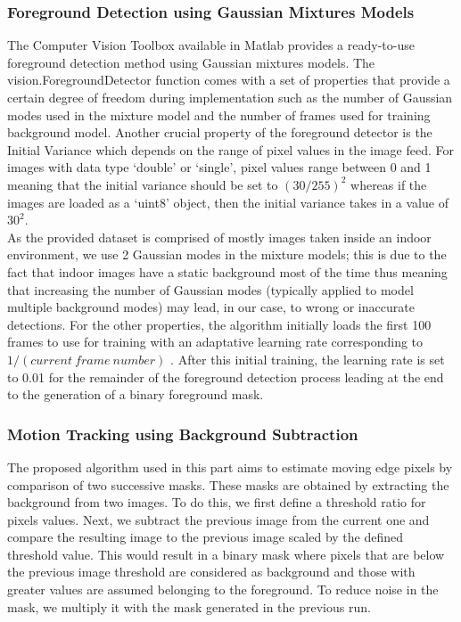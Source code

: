 \subsubsection{Foreground Detection using Gaussian Mixtures Models}
The Computer Vision Toolbox available in Matlab provides a ready-to-use foreground detection method using Gaussian mixtures models. The vision.ForegroundDetector function comes with a set of properties that provide a certain degree of freedom during implementation such as the number of Gaussian modes used in the mixture model and the number of frames used for training background model. Another crucial property of the foreground detector is the Initial Variance which depends on the range of pixel values in the image feed. For images with data type ‘double’ or ‘single’, pixel values range between 0 and 1 meaning that the initial variance should be set to \((30/255)^2\)  whereas if the images are loaded as a ‘uint8’ object, then the initial variance takes in a value of \(30^2\).
\\
As the provided dataset is comprised of mostly images taken inside an indoor environment, we use 2 Gaussian modes in the mixture models; this is due to the fact that indoor images have a static background most of the time thus meaning that increasing the number of Gaussian modes (typically applied to model multiple background modes) may lead, in our case, to wrong or inaccurate detections. For the other properties, the algorithm initially loads the first 100 frames to use for training with an adaptative learning rate corresponding to \(1/\left(current\ frame\ number\right)\) . After this initial training, the learning rate is set to 0.01 for the remainder of the foreground detection process leading at the end to the generation of a binary foreground mask. 

\subsubsection{Motion Tracking using Background Subtraction}
The proposed algorithm used in this part aims to estimate moving edge pixels by comparison of two successive masks. These masks are obtained by extracting the background from two images. To do this, we first define a threshold ratio for pixels values. Next, we subtract the previous image from the current one and compare the resulting image to the previous image scaled by the defined threshold value. This would result in a binary mask where pixels that are below the previous image threshold are considered as background and those with greater values are assumed belonging to the foreground. To reduce noise in the mask, we multiply it with the mask generated in the previous run.
